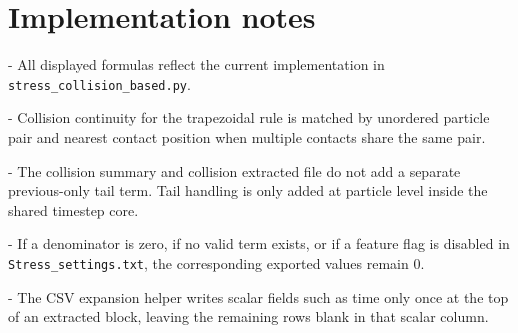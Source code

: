\documentclass[11pt,a4paper]{article}
\newcommand{\code}[1]{\begingroup\urlstyle{tt}\footnotesize\nolinkurl{#1}\endgroup}
\begin{document}
\section*{Implementation notes}
\noindent - All displayed formulas reflect the current implementation in \code{stress_collision_based.py}.\par
\noindent - Collision continuity for the trapezoidal rule is matched by unordered particle pair and nearest contact position when multiple contacts share the same pair.\par
\noindent - The collision summary and collision extracted file do not add a separate previous-only tail term. Tail handling is only added at particle level inside the shared timestep core.\par
\noindent - If a denominator is zero, if no valid term exists, or if a feature flag is disabled in \code{Stress_settings.txt}, the corresponding exported values remain 0.\par
\noindent - The CSV expansion helper writes scalar fields such as time only once at the top of an extracted block, leaving the remaining rows blank in that scalar column.\par
\end{document}
